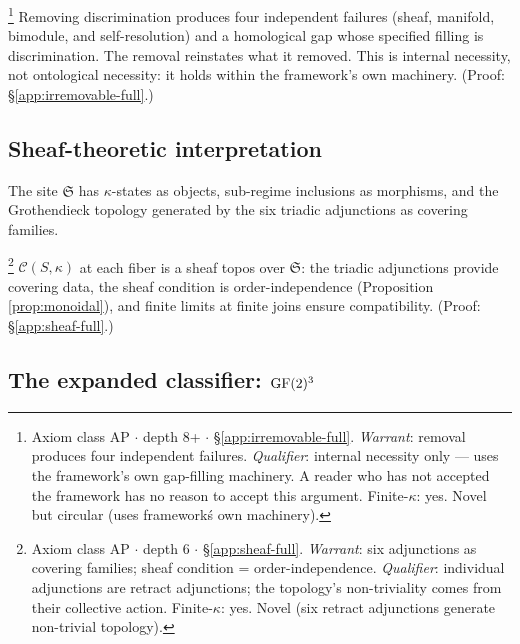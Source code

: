 \begin{theorem}\footnote{Axiom class \textsf{AP} $\cdot$ depth 8+ $\cdot$ \S\ref{app:irremovable-full}.  \emph{Warrant}: removal produces four independent failures. \emph{Qualifier}: internal necessity only --- uses the framework's own gap-filling machinery. A reader who has not accepted the framework has no reason to accept this argument. Finite-$\kappa$: yes. Novel but circular (uses framework\'s own machinery).}
\label{thm:irremovable}
Removing discrimination produces four independent failures
(sheaf, manifold, bimodule, and self-resolution) and a
homological gap whose specified filling is discrimination.
The removal reinstates what it removed. This is internal
necessity, not ontological necessity: it holds within the
framework's own machinery.
(Proof: \S\ref{app:irremovable-full}.)
\end{theorem}

\subsection{Sheaf-theoretic interpretation}\label{sec:sheaf}

\begin{definition}\label{def:site}
The site $\mathfrak{S}$ has $\kappa$-states as objects,
sub-regime inclusions as morphisms, and the Grothendieck
topology generated by the six triadic adjunctions as
covering families.
\end{definition}

\begin{theorem}\label{thm:sheaf}\footnote{Axiom class \textsf{AP} $\cdot$ depth 6 $\cdot$ \S\ref{app:sheaf-full}.  \emph{Warrant}: six adjunctions as covering families; sheaf condition = order-independence. \emph{Qualifier}: individual adjunctions are retract adjunctions; the topology's non-triviality comes from their collective action. Finite-$\kappa$: yes. Novel (six retract adjunctions generate non-trivial topology).}
$\mathcal{C}(S,\kappa)$ at each fiber is a sheaf topos
over $\mathfrak{S}$: the triadic adjunctions provide
covering data, the sheaf condition is order-independence
(Proposition \ref{prop:monoidal}), and finite limits at
finite joins ensure compatibility.
(Proof: \S\ref{app:sheaf-full}.)
\end{theorem}

\subsection{The expanded classifier: $\operatorname{GF}(2)^3$}
\label{sec:expanded}


